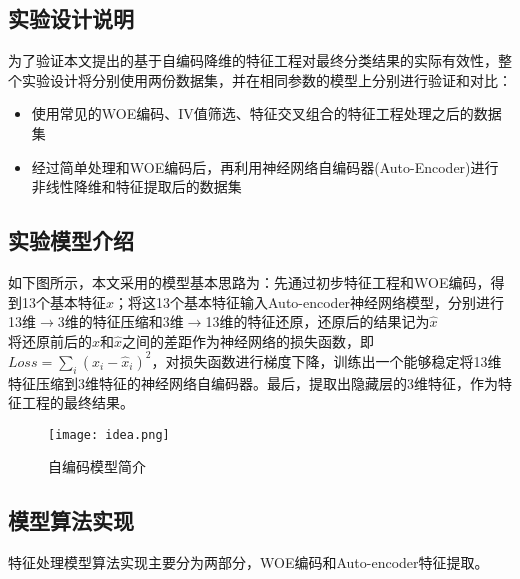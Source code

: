 \subsection{实验设计说明}
为了验证本文提出的基于自编码降维的特征工程对最终分类结果的实际有效性，整个实验设计将分别使用两份数据集，并在相同参数的模型上分别进行验证和对比：

\begin{itemize}
    \item 使用常见的WOE编码、IV值筛选、特征交叉组合的特征工程处理之后的数据集
    \item 经过简单处理和WOE编码后，再利用神经网络自编码器(Auto-Encoder)进行非线性降维和特征提取后的数据集
\end{itemize}

\subsection{实验模型介绍}
如下图所示，本文采用的模型基本思路为：先通过初步特征工程和WOE编码，得到13个基本特征$x$；将这13个基本特征输入Auto-encoder神经网络模型，分别进行13维$\rightarrow$3维的特征压缩和3维$\rightarrow$13维的特征还原，还原后的结果记为$\hat x$\\

将还原前后的$x$和$\hat x$之间的差距作为神经网络的损失函数，即$Loss = \sum\limits_i (x_i-\hat x_i)^2$，对损失函数进行梯度下降，训练出一个能够稳定将13维特征压缩到3维特征的神经网络自编码器。最后，提取出隐藏层的3维特征，作为特征工程的最终结果。

\begin{figure}[H]
    \centering
    \texttt{[image: idea.png]}
    \caption{自编码模型简介}
    \label{fig:idea}
\end{figure}

\subsection{模型算法实现}
特征处理模型算法实现主要分为两部分，WOE编码和Auto-encoder特征提取。

